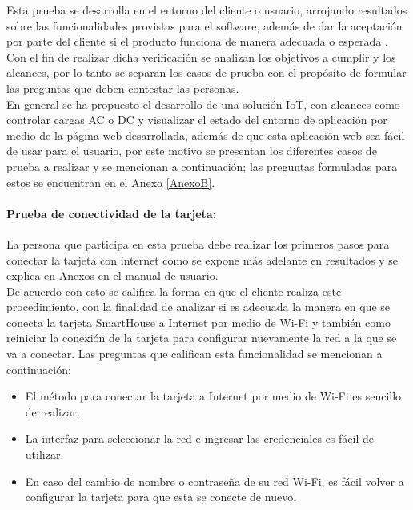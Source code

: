 Esta prueba se desarrolla en el entorno del cliente o usuario, arrojando resultados sobre las funcionalidades provistas para el software, además de dar la aceptación por parte del cliente si el producto funciona de manera adecuada o esperada \cite{PB}. Con el fin de realizar dicha verificación se analizan los objetivos a cumplir y los alcances, por lo tanto se separan los casos de prueba con el propósito de formular las preguntas que deben contestar las personas.\\

En general se ha propuesto el desarrollo de una solución IoT, con alcances como controlar cargas AC o DC y visualizar el estado del entorno de aplicación por medio de la página web desarrollada, además de que esta aplicación web sea fácil de usar para el usuario, por este motivo se presentan los diferentes casos de prueba a realizar y se mencionan a continuación; las preguntas formuladas para estos se encuentran en el Anexo \ref{AnexoB}.

\paragraph{Prueba de conectividad de la tarjeta:} La persona que participa en esta prueba debe realizar los primeros pasos para conectar la tarjeta con internet como se expone más adelante en resultados y se explica en Anexos en el manual de usuario.\\

De acuerdo con esto se califica la forma en que el cliente realiza este procedimiento, con la finalidad de analizar si es adecuada la manera en que se conecta la tarjeta SmartHouse a Internet por medio de Wi-Fi y también como reiniciar la conexión de la tarjeta para configurar nuevamente la red a la que se va a conectar. Las preguntas que califican esta funcionalidad se mencionan a continuación:\\

\begin{itemize}
\item El método para conectar la tarjeta a Internet por medio de Wi-Fi es sencillo de realizar.
\item La interfaz para seleccionar la red e ingresar las credenciales es fácil de utilizar.
\item En caso del cambio de nombre o contraseña de su red Wi-Fi, es fácil volver a configurar la tarjeta para que esta se conecte de nuevo.
\end{itemize}

